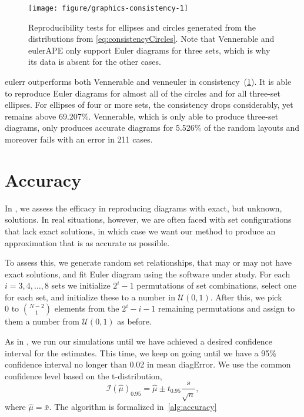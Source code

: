 \documentclass[
  oneside,
  openany,
  numbers=noendperiod,
  parskip=half,
  bibliography=totoc
]{scrbook}\usepackage[]{graphicx}\usepackage{xcolor}
\newenvironment{knitrout}{}{} %
\newcommand{\pkg}[1]{{\fontseries{b}\selectfont #1}}
\begin{document}
\begin{figure}[bhtp]

\begin{knitrout}\small
{}\color{fgcolor}

{\centering \texttt{[image: figure/graphics-consistency-1]} 

}



\end{knitrout}
\caption{Reproducibility tests for ellipses and circles generated from the
distributions from \eqref{eq:consistencyCircles}. Note that \pkg{Vennerable}
and \pkg{eulerAPE} only support Euler diagrams for three sets, which is why its
data is absent for the other cases.\label{fig:consistency}}
\end{figure}



\pkg{eulerr} outperforms both \pkg{Vennerable} and \pkg{venneuler} in
consistency~(\cref{fig:consistency}). It is able to reproduce Euler diagrams for
almost all of the circles and for all three-set ellipses. For ellipses of four
or more sets, the consistency drops considerably, yet remains above
69.207\%. \pkg{Vennerable}, which
is only able to produce three-set diagrams, only produces accurate diagrams for
5.526\% of the random layouts and moreover
fails with an error in 211 cases.

\section{Accuracy}
\label{sec:accuracy}

In , we assess the efficacy in reproducing diagrams
with exact, but unknown, solutions. In real situations, however, we are often
faced with set configurations that lack exact solutions, in which case we want
our method to produce an approximation that is as accurate as possible.

To assess this, we generate random set relationships, that may or may not have
exact solutions, and fit Euler diagram using the software under study. For each
$i=3,4,\dots,8$ sets we initialize $2^i-1$ permutations of set combinations,
select one for each set, and initialize these to a number in
$\mathcal{U}(0, 1)$. After this, we pick $0 \text{ to } \binom{N-2}{1}$ elements
from the $2^i-i-1$ remaining permutations and assign to them a number from
$\mathcal{U}(0, 1)$ as before.

As in , we run our simulations until we have achieved
a desired confidence interval for the estimates. This time, we keep on going
until we have a 95\% confidence interval no longer than 0.02 in mean diagError.
We use the common confidence level based on the t-distribution,
\begin{equation}
\mathcal{I}(\hat{\mu})_{0.95} = \hat{\mu} \pm t_{0.95}\frac{s}{\sqrt{n}},
\end{equation}
where $\hat{\mu} = \bar{x}$. The algorithm is formalized in~\autoref{alg:accuracy}
\end{document}

